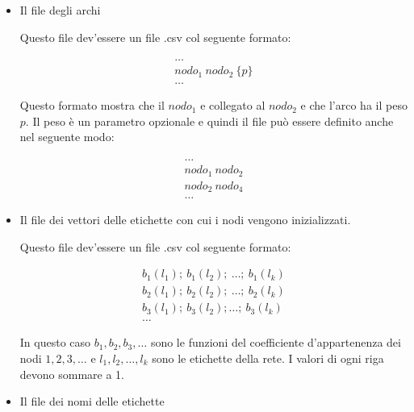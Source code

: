 \documentclass[a4paper,12pt]{report}
\begin{document}
			\begin{itemize}
				\item Il file degli archi 
				
				Questo file dev'essere un file .csv col seguente formato: 

				\begin{equation}
				\begin{aligned}
				\dots \\
				nodo_1\ nodo_2\ \{ p \} \\
				\dots
				\end{aligned}
				\end{equation}

				Questo formato mostra che il $nodo_1$ e collegato al $nodo_2$ e che l'arco ha il peso $p$. Il peso è un parametro opzionale e quindi il file può essere definito anche nel seguente modo: 

				\begin{equation}
				\begin{aligned}
				\dots \\
				nodo_1\  nodo_2 \\
				nodo_2\  nodo_4 \\
				\dots
				\end{aligned}
				\end{equation}				

				\item Il file dei vettori delle etichette con cui i nodi vengono inizializzati. 

				Questo file dev'essere un file .csv col seguente formato: 

				\begin{equation}
				\begin{aligned}
				b_1(l_1);\ b_1(l_2);\ \dots;\ b_1(l_k) \\
				b_2(l_1);\ b_2(l_2);\ \dots;\ b_2(l_k) \\
				b_3(l_1);\ b_3(l_2); \dots;\ b_3(l_k) \\
				\dots
				\end{aligned}
				\end{equation}
				
				In questo caso $b_1, b_2, b_3, \dots$ sono le funzioni del coefficiente d'appartenenza dei nodi $1, 2, 3, \dots$ e $l_1, l_2, \dots, l_k$ sono le etichette della rete. I valori di ogni riga devono sommare a 1. 
				

				\item Il file dei nomi delle etichette
				

\end{itemize}
\end{document}
